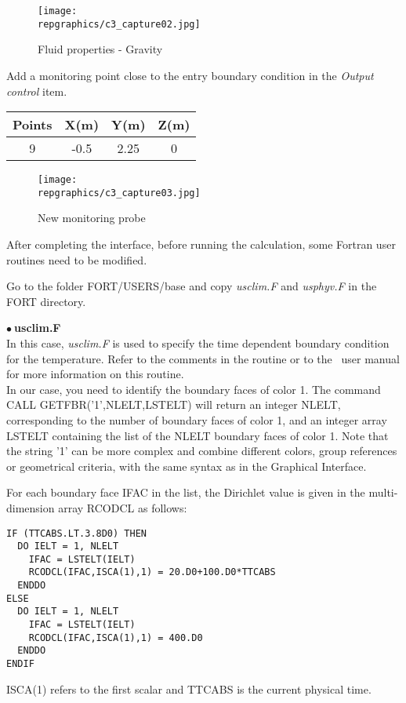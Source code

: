 \begin{figure}[h!]
\begin{center}
\texttt{[image: \\repgraphics/c3\_capture02.jpg]} 
\caption{Fluid properties - Gravity}
\label{fig2_e3}
\end{center}
\end{figure}


\newpage
Add a monitoring point close to the entry boundary condition in the 
{\itshape Output control} item.

\begin{center}
\begin{tabular}{|c|c|c|c|}
\hline
Points & X(m) & Y(m) & Z(m)\\
\hline
9 & -0.5 & 2.25 & 0 \\
\hline
\end{tabular}
\end{center}

\begin{figure}[h!]
\begin{center}
\texttt{[image: \\repgraphics/c3\_capture03.jpg]} 
\caption{New monitoring probe}
\label{fig3_e3}
\end{center}
\end{figure}


\newpage
After completing the interface, before running the calculation,
some Fortran user routines need to be modified. 

Go to the folder FORT/USERS/base and copy {\itshape usclim.F} and
{\itshape usphyv.F} in the FORT directory.

$\bullet\ $\textbf{usclim.F}\\
In this case, {\itshape usclim.F} is used to specify the time dependent boundary
condition for
the temperature. Refer to the comments in the routine or to the \CS\ user manual
for more information on this routine.\\
In our case, you need to identify the boundary faces of color 1. The command\\
CALL GETFBR('1',NLELT,LSTELT)
will return an integer NLELT, corresponding to the number of boundary faces of
color 1, and an integer array LSTELT containing the list of the NLELT boundary
faces of color 1. Note that the string '1' can be more complex and combine
different colors, group references or geometrical criteria, with the same syntax
as in the Graphical Interface.

For each boundary face IFAC in the list, the Dirichlet value is given in the
multi-dimension array RCODCL as follows:
\begin{verbatim}
IF (TTCABS.LT.3.8D0) THEN
  DO IELT = 1, NLELT
    IFAC = LSTELT(IELT)
    RCODCL(IFAC,ISCA(1),1) = 20.D0+100.D0*TTCABS
  ENDDO
ELSE
  DO IELT = 1, NLELT
    IFAC = LSTELT(IELT)
    RCODCL(IFAC,ISCA(1),1) = 400.D0
  ENDDO
ENDIF
\end{verbatim}
ISCA(1) refers to the first scalar and TTCABS is the current physical time.

